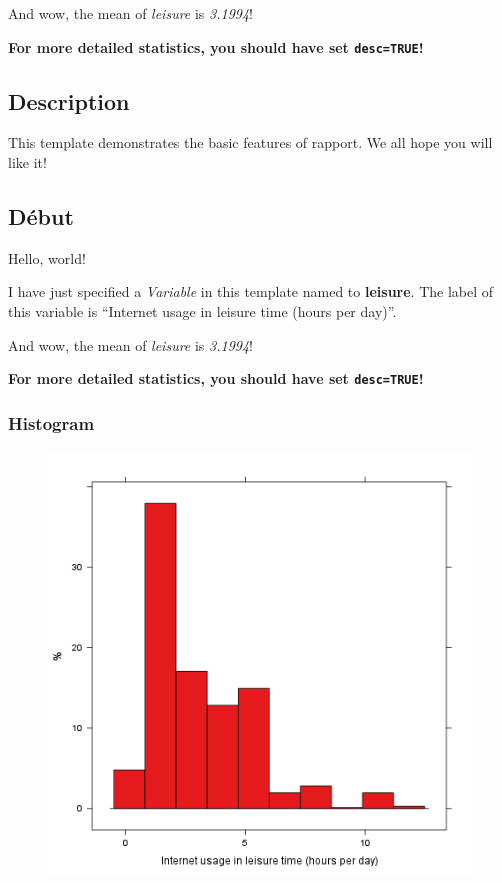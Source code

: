 \documentclass[]{article}
\makeatletter
\def\maxwidth{\ifdim\Gin@nat@width>\linewidth\linewidth
\else\Gin@nat@width\fi}
\let\Oldincludegraphics\includegraphics
\renewcommand{\includegraphics}[1]{\Oldincludegraphics[width=\maxwidth]{#1}}
\makeatother
\begin{document}
And wow, the mean of \emph{leisure} is \emph{3.1994}!

\textbf{For more detailed statistics, you should have set
\texttt{desc=TRUE}!}

\subsection{Description}

This template demonstrates the basic features of rapport. We all hope
you will like it!

\subsection{Début}

Hello, world!

I have just specified a \emph{Variable} in this template named to
\textbf{leisure}. The label of this variable is ``Internet usage in
leisure time (hours per day)''.

And wow, the mean of \emph{leisure} is \emph{3.1994}!

\textbf{For more detailed statistics, you should have set
\texttt{desc=TRUE}!}

\subsubsection{Histogram}

\begin{figure}[htbp]
\centering
\includegraphics{9542b7929dcd934208ee4f18bde6ff31.png}
\caption{}
\end{figure}
\end{document}
